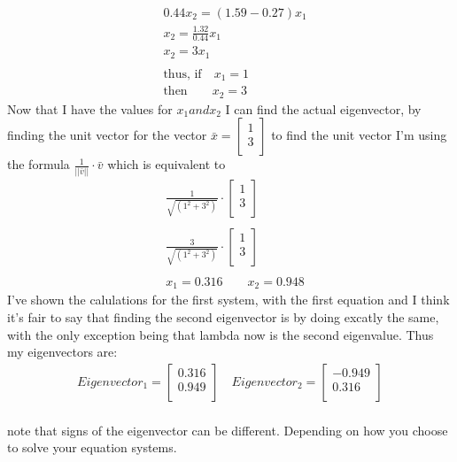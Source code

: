 \begin{align*}
    & 0.44 x_2 = (1.59 - 0.27) x_1 \\
    & x_2 = \frac{1.32}{0.44} x_1 \\
    & x_2 = 3 x_1 \\
    \\
    & \text{thus, if} \quad x_1 = 1 \\
    & \text{then} \quad \quad x_2 = 3 
\end{align*}
Now that I have the values for $x_1 and x_2$
I can find the actual eigenvector, by finding the unit vector for the vector     
$
\bar{x} = \begin{bmatrix}
    1 \\
    3 \\
  \end{bmatrix}
$
to find the unit vector I'm using the formula $\frac{1}{||\bar{v}||} \cdot \bar{v}$
which is equivalent to
\begin{align*}
    &\frac{1}{\sqrt{(1^2 + 3^2)}} \cdot 
                            \begin{bmatrix}
                                1 \\
                                3 \\
                            \end{bmatrix} \\
    \\
                            &\frac{3}{\sqrt{(1^2 + 3^2)}} \cdot 
                            \begin{bmatrix}
                                1 \\
                                3 \\
                            \end{bmatrix} \\
    \\
    & x_1 = 0.316 \quad \quad x_2 = 0.948
\end{align*}
I've shown the calulations for the first system, with the first equation and I think
it's fair to say that finding the second eigenvector is by doing excatly the same, with
the only exception being that lambda now is the second eigenvalue.
Thus my eigenvectors are:
\begin{align*}
    Eigenvector_1 = \begin{bmatrix}
        0.316 \\
        0.949 \\
    \end{bmatrix} 
\quad 
    Eigenvector_2 = \begin{bmatrix}
        -0.949 \\
        0.316 \\
    \end{bmatrix} \\
\end{align*}

\noindent note that signs of the eigenvector can be different. Depending on how you choose to
solve your equation systems.

\newpage